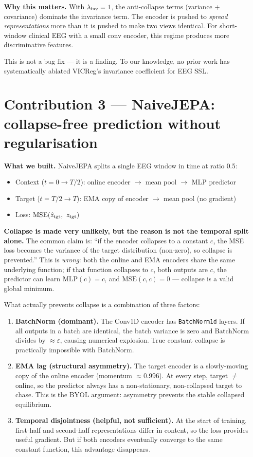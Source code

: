 \documentclass[11pt,a4paper]{article}
\begin{document}
\textbf{Why this matters.}
With $\lambda_{\rm inv} = 1$, the anti-collapse terms (variance + covariance)
dominate the invariance term.  The encoder is pushed to \emph{spread
representations} more than it is pushed to make two views identical.
For short-window clinical EEG with a small conv encoder, this regime
produces more discriminative features.

This is not a bug fix — it is a finding.  To our knowledge, no prior work
has systematically ablated VICReg's invariance coefficient for EEG SSL.

\bigskip

\section{Contribution 3 — NaiveJEPA: collapse-free prediction without regularisation}

\textbf{What we built.}
NaiveJEPA splits a single EEG window in time at ratio 0.5:
\begin{itemize}[noitemsep]
  \item Context ($t = 0 \to T/2$): online encoder $\to$ mean pool $\to$ MLP predictor
  \item Target ($t = T/2 \to T$): EMA copy of encoder $\to$ mean pool (no gradient)
  \item Loss: $\mathrm{MSE}(\hat{z}_{\rm tgt},\ z_{\rm tgt})$
\end{itemize}
\textbf{Collapse is made very unlikely, but the reason is not the temporal
split alone.}  The common claim is: ``if the encoder collapses to a constant
$c$, the MSE loss becomes the variance of the target distribution (non-zero),
so collapse is prevented.''  This is \emph{wrong}: both the online and EMA
encoders share the same underlying function; if that function collapses to
$c$, both outputs are $c$, the predictor can learn $\mathrm{MLP}(c)=c$, and
$\mathrm{MSE}(c,c)=0$ --- collapse is a valid global minimum.

What actually prevents collapse is a combination of three factors:
\begin{enumerate}[noitemsep]
  \item \textbf{BatchNorm (dominant).}  The Conv1D encoder has
    \texttt{BatchNorm1d} layers.  If all outputs in a batch are identical,
    the batch variance is zero and BatchNorm divides by $\approx\varepsilon$,
    causing numerical explosion.  True constant collapse is practically
    impossible with BatchNorm.
  \item \textbf{EMA lag (structural asymmetry).}  The target encoder is a
    slowly-moving copy of the online encoder (momentum $\approx 0.996$).
    At every step, target $\neq$ online, so the predictor always has a
    non-stationary, non-collapsed target to chase.  This is the BYOL
    argument: asymmetry prevents the stable collapsed equilibrium.
  \item \textbf{Temporal disjointness (helpful, not sufficient).}
    At the start of training, first-half and second-half representations
    differ in content, so the loss provides useful gradient.  But if both
    encoders eventually converge to the same constant function, this
    advantage disappears.
\end{enumerate}
\end{document}
